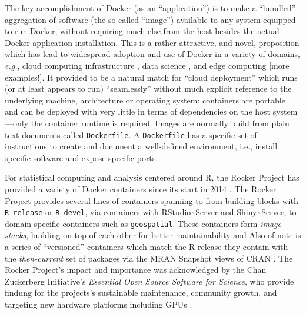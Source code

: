 The key accomplishment of Docker (as an ``application'') is to make a
``bundled'' aggregation of software (the so-called ``image'') available
to any system equipped to run Docker, without requiring much else from
the host besides the actual Docker application installation. This is a
rather attractive, and novel, proposition which has lead to widespread
adoption and use of Docker in a variety of domains, \emph{e.g.}, cloud
computing infrastructure \citep{Bernstein2014}, data science
\citep{boettiger_introduction_2015}, and edge computing
\citep{alam_orchestration_2018} {[}more examples!{]}. It provided to be
a natural match for ``cloud deployment'' which runs (or at least appears
to run) ``seamlessly'' without much explicit reference to the underlying
machine, architecture or operating system: containers are portable and
can be deployed with very little in terms of dependencies on the host
system---only the container runtime is required. Images are normally
build from plain text documents called \texttt{Dockerfile}. A
\texttt{Dockerfile} has a specific set of instructions to create and
document a well-defined environment, i.e., install specific software and
expose specific ports.

For statistical computing and analysis centered around R, the Rocker
Project has provided a variety of Docker containers since its start in
2014 \citep{RJ-2017-065}. The Rocker Project provides several lines of
containers spanning to from building blocks with \texttt{R-release} or
\texttt{R-devel}, via containers with RStudio\textasciitilde{}Server and
Shiny\textasciitilde{}Server, to domain-specific containers such as
\texttt{geospatial}. These containers form \emph{image stacks}, building
on top of each other for better maintainability and Also of note is a
series of ``versioned'' containers which match the R release they
contain with the \emph{then-current} set of packages via the MRAN
Snapshot views of CRAN \citep{microsoft_cran_2019}. The Rocker Project's
impact and importance was acknowledged by the Chan Zuckerberg
Initiative's \emph{Essential Open Source Software for Science}, who
provide findung for the projects's sustainable maintenance, community
growth, and targeting new hardware platforms including GPUs
\citep{chan_zuckerberg_initiative_maintaining_2019}.

